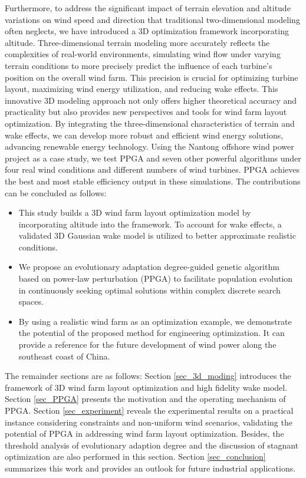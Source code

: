 \documentclass[journal,twoside]{IEEEtran}
\begin{document}
    Furthermore, to address the significant impact of terrain elevation and altitude variations on wind speed and direction that traditional two-dimensional modeling often neglects, we have introduced a 3D optimization framework incorporating altitude. Three-dimensional terrain modeling more accurately reflects the complexities of real-world environments, simulating wind flow under varying terrain conditions to more precisely predict the influence of each turbine's position on the overall wind farm. This precision is crucial for optimizing turbine layout, maximizing wind energy utilization, and reducing wake effects. This innovative 3D modeling approach not only offers higher theoretical accuracy and practicality but also provides new perspectives and tools for wind farm layout optimization. By integrating the three-dimensional characteristics of terrain and wake effects, we can develop more robust and efficient wind energy solutions, advancing renewable energy technology. Using the Nantong offshore wind power project as a case study, we test PPGA and seven other powerful algorithms under four real wind conditions and different numbers of wind turbines. PPGA achieves the best and most stable efficiency output in these simulations. The contributions can be concluded as follows: 
     \begin{itemize}
    	\item [1)]This study builds a 3D wind farm layout optimization model by incorporating altitude into the framework. To account for wake effects, a validated 3D Gaussian wake model is utilized to better approximate realistic conditions. 
    	\item [2)]We propose an evolutionary adaptation degree-guided genetic algorithm based on power-law perturbation (PPGA) to facilitate population evolution in continuously seeking optimal solutions within complex discrete search spaces. 
    	\item [3)]By using a realistic wind farm as an optimization example, we demonstrate the potential of the proposed method for engineering optimization. It can provide a reference for the future development of wind power along the southeast coast of China.
      \end{itemize} 
  
	The remainder sections are as follows: Section \ref{sec_3d_moding} introduces the framework of 3D wind farm layout optimization and high fidelity wake model. Section \ref{sec_PPGA} presents the motivation and the operating mechanism of PPGA. Section \ref{sec_experiment} reveals the experimental results on a practical instance considering constraints and non-uniform wind scenarios, validating the potential of PPGA in addressing wind farm layout optimization. Besides, the threshold analysis of evolutionary adaption degree and the discussion of stagnant optimization are also performed in this section. Section \ref{sec_conclusion} summarizes this work and provides an outlook for future industrial applications.
\end{document}
